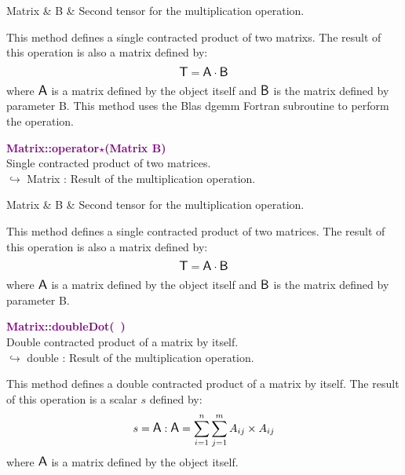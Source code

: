 \begin{tcolorbox}[width=\textwidth,myArgs,tabularx={ll|R}]
Matrix & B & Second tensor for the multiplication operation.
\end{tcolorbox}

This method defines a single contracted product of two matrixs.
The result of this operation is also a matrix defined by:
\begin{equation*}
\mbox{\large\ensuremath{\mathsf{T}}} = \mbox{\large\ensuremath{\mathsf{A}}} \cdot \mbox{\large\ensuremath{\mathsf{B}}}
\end{equation*}
where $\mbox{\large\ensuremath{\mathsf{A}}}$ is a matrix defined by the object itself and $\mbox{\large\ensuremath{\mathsf{B}}}$ is the matrix defined by parameter B.
This method uses the Blas \textsf{dgemm} Fortran subroutine to perform the operation.

\textcolor{purple}{\textbf{Matrix::operator$\star$(Matrix B)}}\label{Matrix::operator*(Matrix B)}\\
Single contracted product of two matrices.\\ \hspace*{10mm}$\hookrightarrow$ Matrix : Result of the multiplication operation.

\begin{tcolorbox}[width=\textwidth,myArgs,tabularx={ll|R}]
Matrix & B & Second tensor for the multiplication operation.
\end{tcolorbox}

This method defines a single contracted product of two matrices.
The result of this operation is also a matrix defined by:
\begin{equation*}
\mbox{\large\ensuremath{\mathsf{T}}} = \mbox{\large\ensuremath{\mathsf{A}}} \cdot \mbox{\large\ensuremath{\mathsf{B}}}
\end{equation*}
where $\mbox{\large\ensuremath{\mathsf{A}}}$ is a matrix defined by the object itself and $\mbox{\large\ensuremath{\mathsf{B}}}$ is the matrix defined by parameter B.

\textcolor{purple}{\textbf{Matrix::doubleDot(~)}}\label{Matrix::doubleDot()}\\
Double contracted product of a matrix by itself.\\ \hspace*{10mm}$\hookrightarrow$ double : Result of the multiplication operation.

This method defines a double contracted product of a matrix by itself.
The result of this operation is a scalar $s$ defined by:
\begin{equation*}
s = \mbox{\large\ensuremath{\mathsf{A}}} : \mbox{\large\ensuremath{\mathsf{A}}} = \sum_{i=1}^{n} \sum_{j=1}^{m} A_{ij}\times A_{ij}
\end{equation*}
where $\mbox{\large\ensuremath{\mathsf{A}}}$ is a matrix defined by the object itself.

